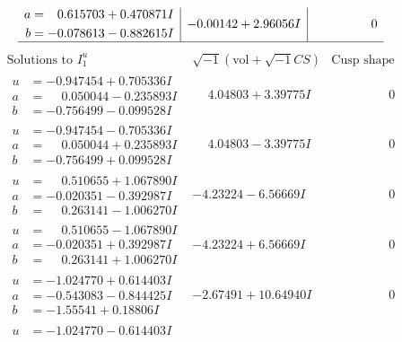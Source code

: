 \documentclass[1p]{elsarticle_modified}
\theoremstyle{definition}
\newcommand{\I}{\sqrt{-1}}
\begin{document}
$$\begin{array}{c|c|c}
\begin{aligned}
a &= \phantom{-}0.615703 + 0.470871 I \\
b &= -0.078613 - 0.882615 I\end{aligned}
 & -0.00142 + 2.96056 I & \phantom{-0.000000 } 0\\
 \hline 
 \end{array}$$\newpage$$\begin{array}{c|c|c}  
\text{Solutions to }I^u_{1}& \I (\text{vol} + \sqrt{-1}CS) & \text{Cusp shape}\\
 \hline 
\begin{aligned}
u &= -0.947454 + 0.705336 I \\
a &= \phantom{-}0.050044 - 0.235893 I \\
b &= -0.756499 - 0.099528 I\end{aligned}
 & \phantom{-}4.04803 + 3.39775 I & \phantom{-0.000000 } 0 \\ \hline\begin{aligned}
u &= -0.947454 - 0.705336 I \\
a &= \phantom{-}0.050044 + 0.235893 I \\
b &= -0.756499 + 0.099528 I\end{aligned}
 & \phantom{-}4.04803 - 3.39775 I & \phantom{-0.000000 } 0 \\ \hline\begin{aligned}
u &= \phantom{-}0.510655 + 1.067890 I \\
a &= -0.020351 - 0.392987 I \\
b &= \phantom{-}0.263141 - 1.006270 I\end{aligned}
 & -4.23224 - 6.56669 I & \phantom{-0.000000 } 0 \\ \hline\begin{aligned}
u &= \phantom{-}0.510655 - 1.067890 I \\
a &= -0.020351 + 0.392987 I \\
b &= \phantom{-}0.263141 + 1.006270 I\end{aligned}
 & -4.23224 + 6.56669 I & \phantom{-0.000000 } 0 \\ \hline\begin{aligned}
u &= -1.024770 + 0.614403 I \\
a &= -0.543083 - 0.844425 I \\
b &= -1.55541 + 0.18806 I\end{aligned}
 & -2.67491 + 10.64940 I & \phantom{-0.000000 } 0 \\ \hline\begin{aligned}
u &= -1.024770 - 0.614403 I \\

\end{aligned}
\end{array}$$
\end{document}
